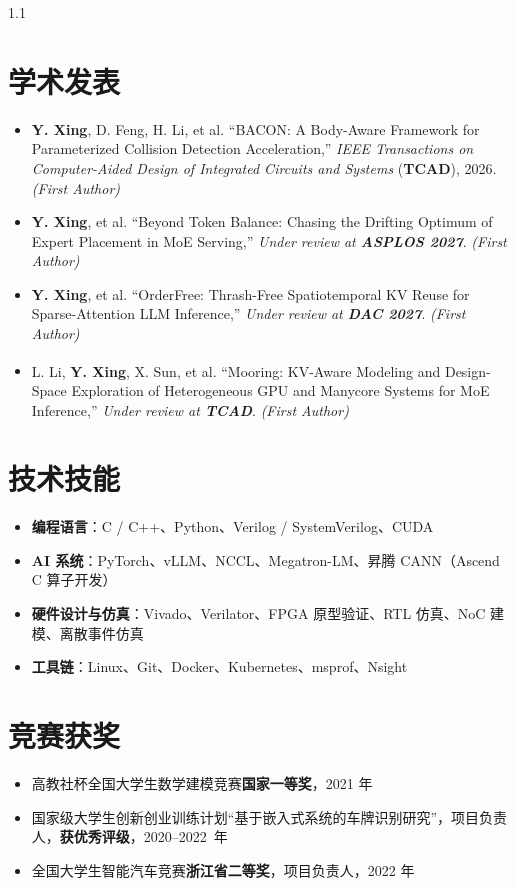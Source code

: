 \documentclass{resume}
\begin{document}
\begin{spacing}{1.1}
		
		\section{学术发表}
		\begin{itemize}[parsep=0.2ex]
			\item \textbf{Y. Xing}, D. Feng, H. Li, et al. ``BACON: A Body-Aware Framework for Parameterized Collision Detection Acceleration,'' \textit{IEEE Transactions on Computer-Aided Design of Integrated Circuits and Systems} (\textbf{TCAD}), 2026. \textit{(First Author)}
			\item \textbf{Y. Xing}, et al. ``Beyond Token Balance: Chasing the Drifting Optimum of Expert Placement in MoE Serving,'' \textit{Under review at \textbf{ASPLOS 2027}}. \textit{(First Author)}
			\item \textbf{Y. Xing}, et al. ``OrderFree: Thrash-Free Spatiotemporal KV Reuse for Sparse-Attention LLM Inference,'' \textit{Under review at \textbf{DAC 2027}}. \textit{(First Author)}
			\item L. Li\textsuperscript{\dag}, \textbf{Y. Xing}\textsuperscript{\dag}, X. Sun, et al. ``Mooring: KV-Aware Modeling and Design-Space Exploration of Heterogeneous GPU and Manycore Systems for MoE Inference,'' \textit{Under review at \textbf{TCAD}}. \textit{(First Author)}
		\end{itemize}
		
		
		
		
		\section{技术技能}
		\begin{itemize}[parsep=0.2ex]
			\item \textbf{编程语言}：C / C++、Python、Verilog / SystemVerilog、CUDA
			\item \textbf{AI 系统}：PyTorch、vLLM、NCCL、Megatron-LM、昇腾 CANN（Ascend C 算子开发）
			\item \textbf{硬件设计与仿真}：Vivado、Verilator、FPGA 原型验证、RTL 仿真、NoC 建模、离散事件仿真
			\item \textbf{工具链}：Linux、Git、Docker、Kubernetes、msprof、Nsight
		\end{itemize}
		
		
		\section{竞赛获奖}
		\begin{itemize}[parsep=0.2ex]
			\item 高教社杯全国大学生数学建模竞赛\textbf{国家一等奖}，2021 年
			\item 国家级大学生创新创业训练计划“基于嵌入式系统的车牌识别研究”，项目负责人，\textbf{获优秀评级}，\mbox{2020--2022 年}
			\item 全国大学生智能汽车竞赛\textbf{浙江省二等奖}，项目负责人，2022 年
		\end{itemize}
		

\end{spacing}
\end{document}
